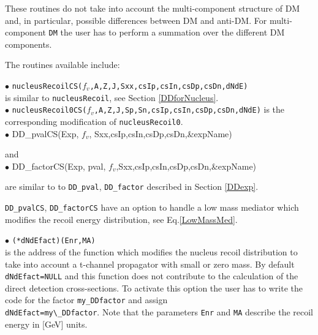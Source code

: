\documentclass[12pt,a4paper]{article}
\begin{document}
These routines do not   take into account the multi-component structure of DM and, in particular, possible   
differences between DM and anti-DM.    For multi-component {\tt DM} the user has to perform a summation over the different DM components. 

The routines available include:
   
\noindent
$\bullet$ \verb|nucleusRecoilCS(|$f_v$\verb|,A,Z,J,Sxx,csIp,csIn,csDp,csDn,dNdE)|\\
is similar to \verb|nucleusRecoil|, see Section \ref{DDforNucleus}.  \\
\noindent
$\bullet$ \verb|nucleusRecoil0CS(|$f_v$\verb|,A,Z,J,Sp,Sn,csIp,csIn,csDp,csDn,dNdE)|
is the corresponding modification of \verb|nucleusRecoil0|.\\

\noindent
$\bullet$ DD\_pvalCS(Exp, $f_v$, Sxx,csIp,csIn,csDp,csDn,\&expName)

\noindent
and\\

\noindent
$\bullet$ DD\_factorCS(Exp, pval, $f_v$,Sxx,csIp,csIn,csDp,csDn,\&expName)

are similar to to  \verb|DD_pval|, \verb|DD_factor| described in Section \ref{DDexp}.

\verb|DD_pvalCS|, \verb|DD_factorCS|   have an option to handle  a low mass mediator which  modifies the recoil energy
distribution, see Eq.\ref{LowMassMed}.



\noindent
$\bullet$ \verb|(*dNdEfact)(Enr,MA)|\\
is the address of the function which modifies the nucleus recoil distribution to take into account a 
t-channel propagator  with  small or zero mass.  By default \verb|dNdEfact=NULL| and this 
function does not contribute to  the calculation of the direct detection cross-sections. To
activate this option the user has to write  the code for the factor  \verb|my_DDfactor| and assign\\
\verb|dNdEfact=my\_DDfactor|.
Note that the  parameters {\tt Enr} and {\tt MA} describe the recoil energy in [GeV] units.
\end{document}
